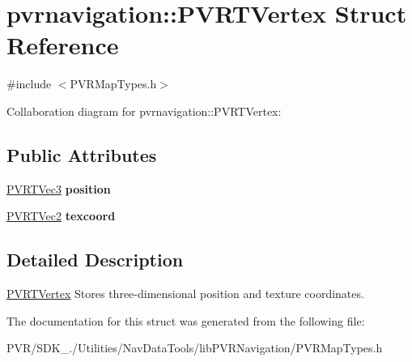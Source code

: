 \hypertarget{structpvrnavigation_1_1_p_v_r_t_vertex}{\section{pvrnavigation\+:\+:P\+V\+R\+T\+Vertex Struct Reference}
\label{structpvrnavigation_1_1_p_v_r_t_vertex}
}


{\ttfamily \#include $<$P\+V\+R\+Map\+Types.\+h$>$}



Collaboration diagram for pvrnavigation\+:\+:P\+V\+R\+T\+Vertex\+:
\subsection*{Public Attributes}
\begin{DoxyCompactItemize}
\item 
\hypertarget{structpvrnavigation_1_1_p_v_r_t_vertex_a7f1a2eb178cac4ad39e6031ba6566f3e}{\hyperlink{struct_p_v_r_t_vec3}{P\+V\+R\+T\+Vec3} {\bfseries position}}\label{structpvrnavigation_1_1_p_v_r_t_vertex_a7f1a2eb178cac4ad39e6031ba6566f3e}

\item 
\hypertarget{structpvrnavigation_1_1_p_v_r_t_vertex_a3a65c8b15a04c9666e7283490dad688f}{\hyperlink{struct_p_v_r_t_vec2}{P\+V\+R\+T\+Vec2} {\bfseries texcoord}}\label{structpvrnavigation_1_1_p_v_r_t_vertex_a3a65c8b15a04c9666e7283490dad688f}

\end{DoxyCompactItemize}


\subsection{Detailed Description}


  \hyperlink{structpvrnavigation_1_1_p_v_r_t_vertex}{P\+V\+R\+T\+Vertex}  Stores three-\/dimensional position and texture coordinates. 

The documentation for this struct was generated from the following file\+:\begin{DoxyCompactItemize}
\item 
P\+V\+R/\+S\+D\+K\+\_./\+Utilities/\+Nav\+Data\+Tools/lib\+P\+V\+R\+Navigation/P\+V\+R\+Map\+Types.\+h\end{DoxyCompactItemize}
